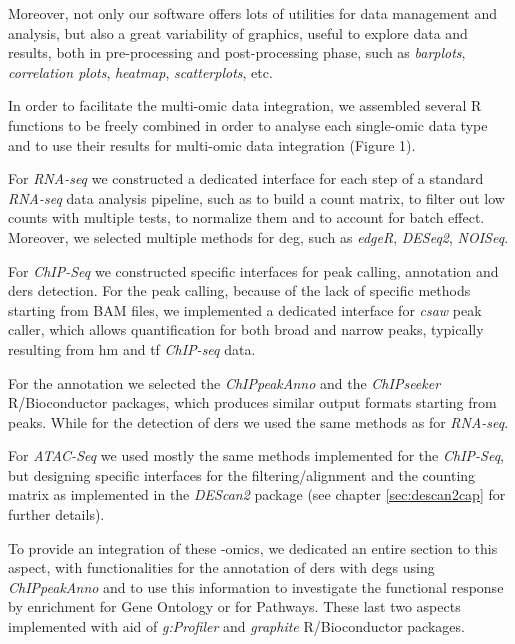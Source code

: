 Moreover, not only our software offers lots of utilities for data management and analysis, but also a great variability of graphics, useful to explore data and results, both in pre-processing and post-processing phase, such as \textit{barplots}, \textit{correlation plots}, \textit{heatmap}, \textit{scatterplots}, etc.

In order to facilitate the multi-omic data integration, we assembled several R functions to be freely combined in order to analyse each single-omic data type and to use their results for multi-omic data integration (Figure 1).

For \textit{RNA-seq} we constructed a dedicated interface for each step of a standard \textit{RNA-seq} data analysis pipeline, such as to build a count matrix, to filter out low counts with multiple tests, to normalize them and to account for batch effect.
Moreover, we selected multiple methods for \gls{deg}, such as \textit{edgeR}, \textit{DESeq2}, \textit{NOISeq}.

For \textit{ChIP-Seq} we constructed specific interfaces for peak calling, annotation and \glspl{der} detection.
For the peak calling, because of the lack of specific methods starting from BAM files, we implemented a dedicated interface for \textit{csaw}\cite{Lun2015} peak caller, which allows quantification for both broad and narrow peaks, typically resulting from \gls{hm} and \gls{tf} \textit{ChIP-seq} data.

For the annotation we selected the \textit{ChIPpeakAnno} and the \textit{ChIPseeker} R/Bioconductor packages, which produces similar output formats starting from peaks.
While for the detection of \glspl{der} we used the same methods as for \textit{RNA-seq}.

For \textit{ATAC-Seq} we used mostly the same methods implemented for the \textit{ChIP-Seq}, but designing specific interfaces for the filtering/alignment and the counting matrix as implemented in the \textit{DEScan2} package (see chapter \ref{sec:descan2cap} for further details).

To provide an integration of these -omics, we dedicated an entire section to this aspect, with functionalities for the annotation of \glspl{der} with \glspl{deg} using \textit{ChIPpeakAnno} and to use this information to investigate the functional response by enrichment for Gene Ontology or for Pathways.
These last two aspects implemented with aid of \textit{g:Profiler} \cite{Reimand2016} and \textit{graphite} \cite{Sales2012a} R/Bioconductor packages.
